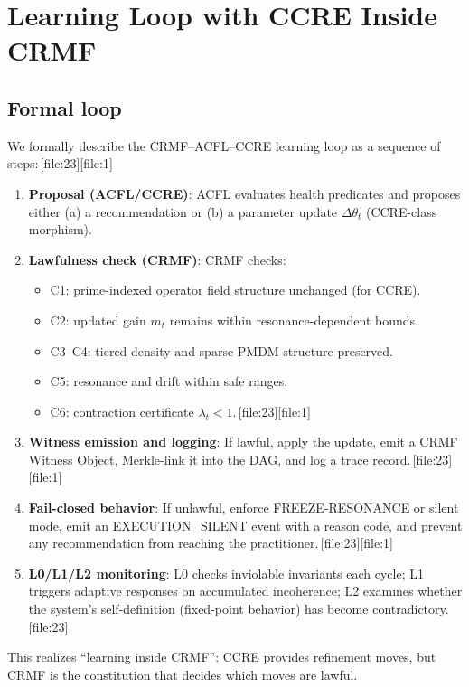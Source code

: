 \documentclass[11pt]{article}
\begin{document}
\section{Learning Loop with CCRE Inside CRMF}

\subsection{Formal loop}

We formally describe the CRMF--ACFL--CCRE learning loop as a sequence of steps:\,[file:23][file:1]
\begin{enumerate}[label=\arabic*., leftmargin=1.5em]
  \item \textbf{Proposal (ACFL/CCRE)}:
    ACFL evaluates health predicates and proposes either (a) a recommendation or (b) a parameter update $\Delta\theta_t$ (CCRE-class morphism).
  \item \textbf{Lawfulness check (CRMF)}:
    CRMF checks:
    \begin{itemize}
      \item C1: prime-indexed operator field structure unchanged (for CCRE).
      \item C2: updated gain $m_t$ remains within resonance-dependent bounds.
      \item C3--C4: tiered density and sparse PMDM structure preserved.
      \item C5: resonance and drift within safe ranges.
      \item C6: contraction certificate $\lambda_t < 1$.\,[file:23][file:1]
    \end{itemize}
  \item \textbf{Witness emission and logging}:
    If lawful, apply the update, emit a CRMF Witness Object, Merkle-link it into the DAG, and log a trace record.\,[file:23][file:1]
  \item \textbf{Fail-closed behavior}:
    If unlawful, enforce FREEZE-RESONANCE or silent mode, emit an EXECUTION\_SILENT event with a reason code, and prevent any recommendation from reaching the practitioner.\,[file:23][file:1]
  \item \textbf{L0/L1/L2 monitoring}:
    L0 checks inviolable invariants each cycle; L1 triggers adaptive responses on accumulated incoherence; L2 examines whether the system's self-definition (fixed-point behavior) has become contradictory.\,[file:23]
\end{enumerate}
This realizes ``learning inside CRMF'': CCRE provides refinement moves, but CRMF is the constitution that decides which moves are lawful.
\end{document}
